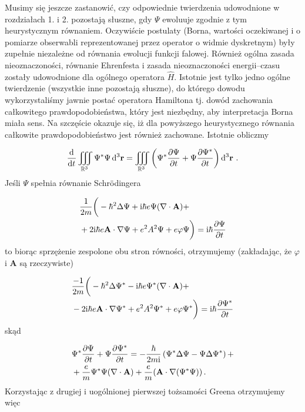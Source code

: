 \documentclass{myclass}
\begin{document}
Musimy się jeszcze zastanowić, czy odpowiednie twierdzenia udowodnione w rozdziałach 1. i 2.
pozostają słuszne, gdy \(\Psi\) ewoluuje zgodnie z tym heurystycznym równaniem. Oczywiście postulaty
(Borna, wartości oczekiwanej i o pomiarze obserwabli reprezentowanej przez operator o widmie
dyskretnym) były zupełnie niezależne od równania ewolucji funkcji falowej. Również ogólna zasada
nieoznaczoności, równanie Ehrenfesta i zasada nieoznaczoności energii--czasu zostały udowodnione dla
ogólnego operatora \(\hat{H}\). Istotnie jest tylko jedno ogólne twierdzenie (wszystkie inne
pozostają słuszne), do którego dowodu wykorzystaliśmy jawnie postać operatora Hamiltona tj. dowód
zachowania całkowitego prawdopodobieństwa, który jest niezbędny, aby interpretacja Borna miała sens.
Na szczęście okazuje się, iż dla powyższego heurystycznego równania całkowite prawdopodobieństwo
jest również zachowane. Istotnie obliczmy

\begin{equation*}
    \dv[]{}{t}\iiint_{\mathbb{R}^3}\Psi^*\Psi\dd{^3\mathbf{r}}=\iiint_{\mathbb{R}^3}\left(\Psi^*\pdv{\Psi}{t}+\Psi\pdv{\Psi^*}{t}\right)\dd{^3\mathbf{r}}\,.
\end{equation*}
Jeśli \(\Psi\) spełnia równanie Schr{\"o}dingera

\begin{equation*}
\begin{split}
&\frac{1}{2m}\bigg(-\hbar^2\Delta\Psi+\mathrm{i}\hbar e\Psi(\nabla\cdot\mathbf{A})+\\
&+2\mathrm{i}\hbar e\mathbf{A}\cdot\nabla\Psi+e^2A^2\Psi+e\varphi\Psi\bigg)=\mathrm{i}\hbar\pdv{\Psi}{t}  
\end{split}
\end{equation*}
to biorąc sprzężenie zespolone obu stron równości, otrzymujemy (zakładając, że \(\varphi\) i
\(\mathbf{A}\) są rzeczywiste)

\begin{equation*}
\begin{split}
    &\frac{-1}{2m}\bigg(-\hbar^2\Delta\Psi^*-\mathrm{i}\hbar e\Psi^*(\nabla\cdot\mathbf{A})+\\
    &-2\mathrm{i}\hbar e\mathbf{A}\cdot\nabla\Psi^*+e^2A^2\Psi^*+e\varphi\Psi^*\bigg)=\mathrm{i}\hbar\pdv{\Psi^*}{t}
\end{split}
\end{equation*}
skąd

\begin{equation*}
    \begin{split}
        &\Psi^*\pdv{\Psi}{t}+\Psi\pdv{\Psi^*}{t}=-\frac{\hbar}{2m\mathrm{i}}\left(\Psi^*\Delta\Psi-\Psi\Delta\Psi^*\right)+\\
        &+\frac{e}{m}\Psi^*\Psi(\nabla\cdot\mathbf{A})+\frac{e}{m}(\mathbf{A}\cdot\nabla(\Psi^*\Psi))\,.
    \end{split}
\end{equation*}
Korzystając z drugiej i uogólnionej pierwszej tożsamości Greena otrzymujemy więc
\end{document}
